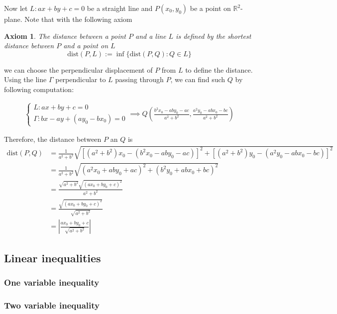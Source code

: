 \documentclass[12pt]{article}
\newtheorem*{axiom}{Axiom}
\begin{document}
    Now let $L:ax+by+c=0$ be a straight line and $P(x_0,y_0)$ be a point on $\mathbb{R}^2$-plane. Note that with the following axiom

    \begin{axiom}
        The distance between a point $P$ and a line $L$ is defined by the shortest distance between $P$ and a point on $L$ $$\mathrm{dist}(P,L):=\inf\{\mathrm{dist}(P,Q):Q\in L\}$$
    \end{axiom}

    we can choose the perpendicular displacement of $P$ from $L$ to define the distance. Using the line $\Gamma$ perpendicular to $L$ passing through $P$, we can find such $Q$ by following computation:

    \begin{align*}
        \begin{cases}
            L:ax+by+c=0\\
            \Gamma:bx-ay+(ay_0-bx_0)=0
        \end{cases}\implies Q(\frac{b^2x_0-aby_0-ac}{a^2+b^2},\frac{a^2y_0-abx_0-bc}{a^2+b^2})
    \end{align*}

    Therefore, the distance between $P$ an $Q$ is \begin{align*}
        \mathrm{dist}(P,Q)&=\frac{1}{a^2+b^2}\sqrt{[(a^2+b^2)x_0-(b^2x_0-aby_0-ac)]^2+[(a^2+b^2)y_0-(a^2y_0-abx_0-bc)]^2}\\
        &=\frac{1}{a^2+b^2}\sqrt{(a^2x_0+aby_0+ac)^2+(b^2y_0+abx_0+bc)^2}\\
        &=\frac{\sqrt{a^2+b^2}\sqrt{(ax_0+by_0+c)^2}}{a^2+b^2}\\
        &=\frac{\sqrt{(ax_0+by_0+c)^2}}{\sqrt{a^2+b^2}}\\
        &=\left|\frac{ax_0+by_0+c}{\sqrt{a^2+b^2}}\right|
    \end{align*}

    \subsection{Linear inequalities}

    \subsubsection{One variable inequality}

    \subsubsection{Two variable inequality}
\end{document}
